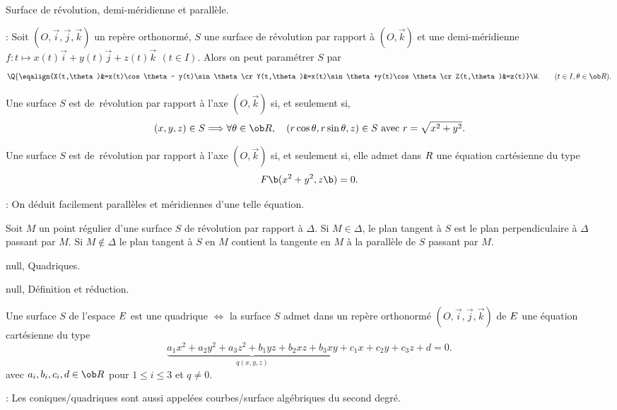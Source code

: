 \centerline{%
}%
\Figure [Index=Surfaces!de revolution@de révolution]  Surface de révolution, demi-méridienne et parallèle.
\bigskip

\Remarque : Soit $(O,\vec i,\vec j,\vec k)$ un repère orthonormé, 
$S$ une surface de révolution par rapport à $(O,\vec k)$ 
et une demi-méridienne $f:t\mapsto x(t)\vec i+y(t)\vec j+z(t)\vec k\ \,(t\in I)$. 
Alors on peut paramétrer $S$ par 
$$\Q\{\eqalign{X(t,\theta)&=x(t)\cos\theta- y(t)\sin\theta\cr
Y(t,\theta)&=x(t)\sin\theta+y(t)\cos\theta \cr
Z(t,\theta)&=z(t)}\W.\qquad(t\in I,\theta\in\ob R).
$$


Une surface $S$ est de~révolution par rapport à l'axe $(O,\vec k)$ si, et seulement si, 
$$
(x,y,z)\in S\Longrightarrow \forall\theta\in\ob R,\quad (r\cos\theta,r\sin\theta,z)\in S\mbox{ avec }r=\sqrt{x^2+y^2}.
$$

\Propriete [${\sc R=(O,\vec i,\vec j,\vec k)}$ un repère orthonormé] 
Une surface $S$ est de~révolution par rapport à l'axe $(O,\vec k)$ 
si, et seulement si, elle admet dans $\sc R$ une équation cartésienne 
du type 
$$
F\b(x^2+y^2,z\b)=0.
$$

\Remarque : On déduit facilement parallèles et méridiennes d'une telle équation. 
\bigskip

\Propriete [] Soit $M$ un point régulier d'une surface $S$ 
de révolution par rapport à $\Delta$. 
\pn
Si $M\in\Delta$, le plan tangent à $S$ est le plan perpendiculaire à $\Delta$ passant par $M$. 
\pn
Si $M\notin\Delta$ le plan tangent à $S$ en $M$ contient la tangente en $M$ 
à la parallèle de $S$ passant par $M$. 
\bigskip

\Section null, Quadriques.
\bigskip

\Subsection null, Définition et réduction.

\Definition [] Une surface $S$ de l'espace $\sc E$ est une quadrique $\Longleftrightarrow$ la surface 
$S$ admet dans un repère orthonormé $(O,\vec i,\vec j,\vec k)$ de $\sc E$ 
une équation cartésienne du type 
$$
\underbrace{a_1x^2+a_2y^2+a_3z^2+b_1yz+b_2xz+b_3xy}_{q(x,y,z)}+c_1x+c_2y+c_3z+d=0.
$$
avec $a_i,b_i,c_i,d\in\ob R$ pour $1\le i\le 3$ et $q\neq0$. 
\bigskip

\Remarque : Les coniques/quadriques sont aussi appelées courbes/surface algébriques du second degré. 
\bigskip

